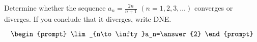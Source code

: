 \documentclass{ximera}
\author{Gregory Hartman \and Matthew Carr}
\begin{document}
\begin{exercise}



Determine whether the sequence $a_n=\frac{2n}{n+1}$ $(n=1,2,3,\ldots)$ converges or diverges. If you conclude that it diverges, write DNE.

\[
\begin{prompt}
\lim_{n\to\infty}a_n=\answer{2}
\end{prompt}
\]


\end{exercise}
\end{document}
